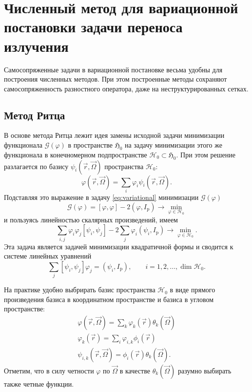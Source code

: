 \chapter{Численный метод для вариационной постановки задачи переноса излучения}

Самосопряженные задачи в вариационной постановке весьма удобны для построения численных методов. При этом построенные методы сохраняют самосопряженность разностного оператора, даже на неструктурированных сетках. 

\section{Метод Ритца}

В основе метода Ритца \cite{marchuk1981} лежит идея замены исходной задачи минимизации функционала $\mathcal{G}(\varphi)$ в пространстве $\mathfrak{H}_0$ на задачу минимизации этого же функционала в конечномерном подпространстве $\mathcal{H}_0 \subset \mathfrak{H}_0$. При этом решение разлагается по базису $\psi_i(\vec r, \vec \Omega)$ пространства $\mathcal{H}_0$:
\[
\varphi(\vec r, \vec \Omega) = \sum_i \varphi_i \psi_i(\vec r, \vec \Omega).
\]
Подставляя это выражение в задачу \eqref{eq:variational} минимизации $\mathcal{G}(\varphi)$
\[
\mathcal{G}(\varphi) = [\varphi, \varphi] - 2 (\varphi, I_\text{p}) \to \min_{\varphi \in \mathcal{H}_0}
\label{eq:minimize}
\]
и пользуясь линейностью скалярных произведений, имеем
\[
\sum_{i,j} \varphi_{i}\varphi_{j} [\psi_i, \psi_j] - 2 \sum_{j} \varphi_i(\psi_i, I_\text{p})\to \min_{\varphi \in \mathcal{H}_0}.
\]
Эта задача является задачей минимизации квадратичной формы и сводится к системе линейных уравнений
\begin{equation*}
\sum_{j} [\psi_i, \psi_j] \varphi_j = (\psi_i, I_\text{p}), \qquad i = 1, 2, \dots, \operatorname{dim} \mathcal{H}_0.
\end{equation*}

На практике удобно выбрирать базис пространства $\mathcal{H}_0$ в виде прямого произведения базиса в координатном пространстве и базиса в угловом пространстве:
\begin{gather}
\varphi(\vec r, \vec \Omega) = \sum_k \varphi_{k}(\vec r)\theta_k(\vec \Omega)\\
\varphi_k(\vec r) = \sum_i \varphi_{i,k} \phi_i(\vec r)\\
\psi_{i,k}(\vec r, \vec \Omega) = \phi_i(\vec r) \theta_k (\vec \Omega).
\label{eq:discrete}
\end{gather}
Отметим, что в силу четности $\varphi$ по $\vec \Omega$ в качестве $\theta_k(\vec \Omega)$ разумно выбирать также четные функции.

